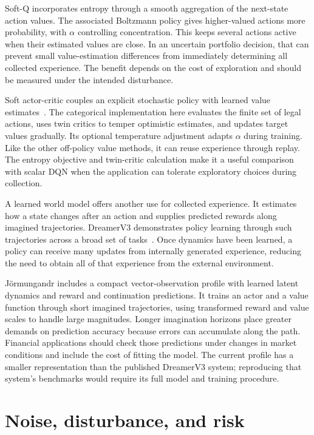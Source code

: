 \documentclass{strategynet-journal}
\begin{document}
Soft-Q incorporates entropy through a smooth aggregation of the next-state
action values. The associated Boltzmann policy gives higher-valued actions
more probability, with $\alpha$ controlling concentration. This keeps several
actions active when their estimated values are close. In an uncertain
portfolio decision, that can prevent small value-estimation differences from
immediately determining all collected experience. The benefit depends on the
cost of exploration and should be measured under the intended disturbance.

Soft actor-critic couples an explicit stochastic policy with learned value
estimates~\cite{sac}. The categorical implementation here evaluates the finite
set of legal actions, uses twin critics to temper optimistic estimates, and
updates target values gradually. Its optional temperature adjustment adapts
$\alpha$ during training. Like the other off-policy value methods, it can reuse
experience through replay. The entropy objective and twin-critic calculation
make it a useful comparison with scalar DQN when the application can tolerate
exploratory choices during collection.

A learned world model offers another use for collected experience. It estimates
how a state changes after an action and supplies predicted rewards along
imagined trajectories. DreamerV3 demonstrates policy learning through such
trajectories across a broad set of tasks~\cite{dreamerv3}. Once dynamics have
been learned, a policy can receive many updates from internally generated
experience, reducing the need to obtain all of that experience from the
external environment.

Jörmungandr includes a compact vector-observation profile with learned latent
dynamics and reward and continuation predictions. It trains an actor and a
value function through short imagined trajectories, using transformed reward
and value scales to handle large magnitudes. Longer imagination horizons
place greater demands on prediction accuracy because errors can accumulate
along the path. Financial applications should check those predictions under
changes in market conditions and include the cost of fitting the model.
The current profile has a smaller representation than the published DreamerV3
system; reproducing that system's benchmarks would require its full model and
training procedure.

\section{Noise, disturbance, and risk}
\end{document}
